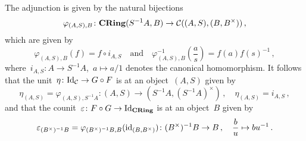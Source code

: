 \subsection{}

The adjunction is given by the natural bijections
\[
          \varphi_{(A,S), B}
  \colon  \mathbf{CRing}(S^{-1} A, B)
  \to     \mathcal{C}((A,S), (B,B^\times)) \,,
\]
which are given by
\[
    \varphi_{(A,S),B}(f)
  = f \circ i_{A,S}
  \quad\text{and}\quad
    \varphi_{(A,S),B}^{-1}\left( \frac{a}{s} \right)
  = f(a) f(s)^{-1} \,,
\]
where~$i_{A,S} \colon A \to S^{-1} A$,~$a \mapsto a/1$ denotes the canonical homomorphism.
It follows that the unit~$\eta \colon \mathrm{Id}_{\mathcal{C}} \to G \circ F$ is at an object~$(A,S)$ given by
\[
            \eta_{(A,S)}
  =         \varphi_{(A,S), S^{-1} A}
  \colon    ( A, S )
  \to       ( S^{-1} A, (S^{-1} A)^\times ) \,,
  \quad     \eta_{(A,S)}
  =         i_{A,S} \,,
\]
and that the counit~$\varepsilon \colon F \circ G \to \mathrm{Id}_{\mathbf{CRing}}$ is at an object~$B$ given by
\[
            \varepsilon_{(B^\times)^{-1} B}
  =         \varphi_{(B^\times)^{-1} B, B}( \operatorname{id}_{(B,B^\times)} )
  \colon    (B^\times)^{-1} B
  \to       B \,,
  \quad     \frac{b}{u}
  \mapsto   b u^{-1} \,.
\]




